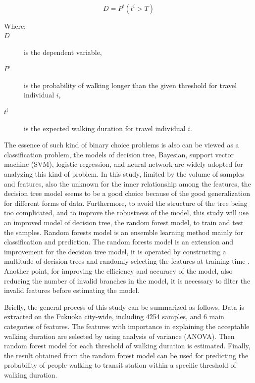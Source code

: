 \documentclass[Journal,letterpaper]{ascelike-new}
\begin{document}
%
\begin{equation}
    D=P^i(t^i>T)
    \label{eq:1}
\end{equation}

%
\begin{description}
    \item[Where:]
    \item[$D$] is the dependent variable,
    \item[$P^i$] is the probability of walking longer than the given threshold for travel individual $i$,
    \item[$t^i$] is the expected walking duration for travel individual $i$.
\end{description}

%
The essence of such kind of binary choice problems is also can be viewed as a classification problem, the models of decision tree, Bayesian, support vector machine (SVM), logistic regression, and neural network are widely adopted for analyzing this kind of problem. In this study, limited by the volume of samples and features, also the unknown for the inner relationship among the features, the decision tree model seems to be a good choice because of the good generalization for different forms of data. Furthermore, to avoid the structure of the tree being too complicated, and to improve the robustness of the model, this study will use an improved model of decision tree, the random forest model, to train and test the samples. Random forests model is an ensemble learning method mainly for classification and prediction. The random forests model is an extension and improvement for the decision tree model, it is operated by constructing a multitude of decision trees and randomly selecting the features at training time \cite{Ho1995,Ho1998}. Another point, for improving the efficiency and accuracy of the model, also reducing the number of invalid branches in the model, it is necessary to filter the invalid features before estimating the model.

%
Briefly, the general process of this study can be summarized as follows. Data is extracted on the Fukuoka city-wide, including 4254 samples, and 6 main categories of features. The features with importance in explaining the acceptable walking duration are selected by using analysis of variance (ANOVA). Then random forest model for each threshold of walking duration is estimated. Finally, the result obtained from the random forest model can be used for predicting the probability of people walking to transit station within a specific threshold of walking duration.
\end{document}
